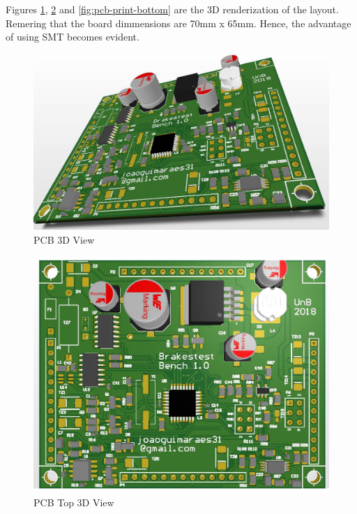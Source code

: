 		Figures \ref{fig:pcb-print-diagonal}, \ref{fig:pcb-print-top} and \ref{fig:pcb-print-bottom} are the 3D renderization of the layout. Remering that the board dimmensions are 70mm x 65mm. Hence, the advantage of using SMT becomes evident.

		\begin{figure}[htbp]
			\centering
			\includegraphics[scale=0.7]{figuras/fig-pcb-print-diagonal.png}
			\caption{PCB 3D View \cite{pcb-print-diagonal}}
			\label{fig:pcb-print-diagonal}
		\end{figure}

		\begin{figure}[htbp]
			\centering
			\includegraphics[scale=0.7]{figuras/fig-pcb-print-top.png}
			\caption{PCB Top 3D View \cite{pcb-print-top}}
			\label{fig:pcb-print-top}
		\end{figure}

